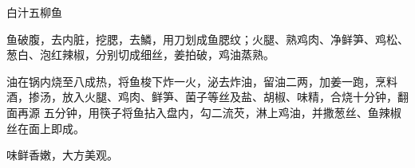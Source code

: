 %
%
%
%
%
%
%
\begin{recipe}{白汁五柳鱼}

\ingredients


\preparation

\step 鱼破腹，去内脏，挖腮，去鱗，用刀划成鱼腮纹；火腿、熟鸡肉、净鲜笋、鸡松、
葱白、泡红辣椒，分别切成细丝，姜拍破，鸡油蒸熟。

\step 油在锅内烧至八成热，将鱼梭下炸一火，泌去炸油，留油二两，加姜一跑，烹料
酒，掺汤，放入火腿、鸡肉、鲜笋、菌子等丝及盐、胡椒、味精，合烧十分钟，翻面再源
五分钟，用筷子将鱼拈入盘内，勾二流芡，淋上鸡油，并撒葱丝、鱼辣椒丝在面上即成。

\features

味鲜香嫩，大方美观。

\end{recipe}

